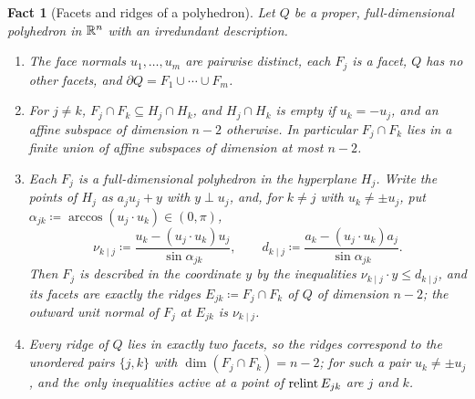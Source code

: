 \documentclass[11pt,letterpaper]{article}
\theoremstyle{plain}
\newtheorem{fact}{Fact}[section]
\begin{document}
\begin{fact}[Facets and ridges of a polyhedron]\label{tb:facets}
Let \(Q\) be a proper, full-dimensional polyhedron in \(\mathbb R^n\) with an
irredundant description.
\begin{enumerate}
\item[(a)] The face normals \(u_1,\ldots,u_m\) are pairwise distinct, each
\(F_j\) is a facet, \(Q\) has no other facets, and
\(\partial Q=F_1\cup\cdots\cup F_m\).
\item[(b)] For \(j\ne k\), \(F_j\cap F_k\subseteq H_j\cap H_k\), and
\(H_j\cap H_k\) is empty if \(u_k=-u_j\), and an affine subspace of
dimension \(n-2\) otherwise. In particular \(F_j\cap F_k\) lies in a
finite union of affine subspaces of dimension at most \(n-2\).
\item[(c)] Each \(F_j\) is a full-dimensional polyhedron in the hyperplane
\(H_j\). Write the points of \(H_j\) as \(a_ju_j+y\) with \(y\perp u_j\), and,
for \(k\ne j\) with \(u_k\ne\pm u_j\), put
\(\alpha_{jk}\coloneqq \arccos(u_j\cdot u_k)\in(0,\pi)\),
\[
 \nu_{k\mid j}\coloneqq \frac{u_k-(u_j\cdot u_k)u_j}{\sin\alpha_{jk}},\qquad
 d_{k\mid j}\coloneqq \frac{a_k-(u_j\cdot u_k)a_j}{\sin\alpha_{jk}} .
\]
Then \(F_j\) is described in the coordinate \(y\) by the inequalities
\(\nu_{k\mid j}\cdot y\le d_{k\mid j}\), and its facets are exactly the
ridges \(E_{jk}\coloneqq F_j\cap F_k\) of \(Q\) of dimension \(n-2\); the outward
unit normal of \(F_j\) at \(E_{jk}\) is \(\nu_{k\mid j}\).
\item[(d)] Every ridge of \(Q\) lies in exactly two facets, so the ridges
correspond to the unordered pairs \(\{j,k\}\) with
\(\dim(F_j\cap F_k)=n-2\); for such a pair \(u_k\ne\pm u_j\), and the
only inequalities active at a point of \(\operatorname{relint} E_{jk}\) are \(j\) and \(k\).
\end{enumerate}
\end{fact}
\end{document}
